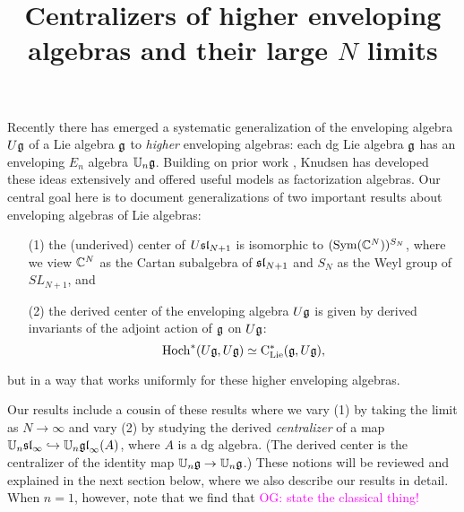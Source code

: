 \documentclass[11pt]{amsart}
\numberwithin{equation}{section}
\def\owen{\textcolor{magenta}{OG: }\textcolor{magenta}}
\begin{document}
\title{Centralizers of higher enveloping algebras and their large $N$ limits}

%


\maketitle
\thispagestyle{empty}

\tableofcontents
 
Recently there has emerged a systematic generalization of the enveloping algebra $U\fg$ of a Lie algebra $\fg$ to {\em higher} enveloping algebras:
each dg Lie algebra $\fg$ has an enveloping $E_n$ algebra $\UU_n\fg$.
Building on prior work \cite{BD, AF}, Knudsen \cite{Knudsen} has developed these ideas extensively and offered useful models as factorization algebras.
Our central goal here is to document generalizations of two important results about enveloping algebras of Lie algebras: 
\begin{enumerate}
\item[(1)] the (underived) center of $U\sl_{N+1}$ is isomorphic to $(\Sym(\CC^{N}))^{S_N}$, where we view $\CC^{N}$ as the Cartan subalgebra of $\sl_{N+1}$ and $S_N$ as the Weyl group of $SL_{N+1}$, and
\item[(2)] the derived center of the enveloping algebra $U\fg$ is given by derived invariants of the adjoint action of $\fg$ on $U\fg$:
\[
\Hoch^*(U\fg,U\fg) \simeq \clies(\fg, U\fg),
\]
\end{enumerate}
but in a way that works uniformly for these higher enveloping algebras.

Our results include a cousin of these results where we vary (1) by taking the limit as $N \to \infty$ and vary (2) by studying the derived {\em centralizer} of a map $\UU_n\sl_\infty \hookrightarrow \UU_n\gl_\infty(A)$, where $A$ is a dg algebra.
(The derived center is the centralizer of the identity map $\UU_n\fg \to \UU_n\fg$.)
These notions will be reviewed and explained in the next section below,
where we also describe our results in detail.
When $n=1$, however, note that we find that \owen{state the classical thing!}
\end{document}
